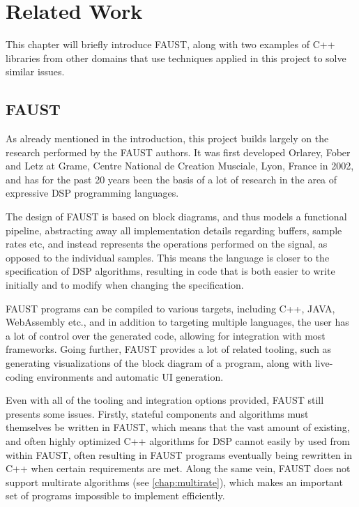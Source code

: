 \chapter{Related Work}
\label{chap:related}

This chapter will briefly introduce FAUST, along with two examples of C++ libraries from other domains that
use techniques applied in this project to solve similar issues.

\section{FAUST}
\label{sec:related_faust}
As already mentioned in the introduction, this project builds largely on the research performed by the FAUST
authors. It was first developed Orlarey, Fober and Letz at Grame, Centre National de Creation Musciale, Lyon,
France in 2002\autocite{orlarey2002}, and has for the past 20 years been the basis of a lot of research in the
area of expressive DSP programming languages\autocite{letz:hal-02158925, buffa:hal-01721483, dimitrov:hal-02158954, gaster2018, berdahl:hal-03162897}.

The design of FAUST is based on block diagrams, and thus models a functional pipeline, abstracting away all
implementation details regarding buffers, sample rates etc, and instead represents the operations performed
on the signal, as opposed to the individual samples. This means the language is closer to the specification
of DSP algorithms, resulting in code that is both easier to write initially and to modify when changing the
specification.

FAUST programs can be compiled to various targets, including C++, JAVA, WebAssembly etc., and in addition to
targeting multiple languages, the user has a lot of control over the generated code, allowing for integration
with most frameworks. Going further, FAUST provides a lot of related tooling\autocite{faustweb}, such as
generating visualizations of the block diagram of a program, along with live-coding environments and
automatic UI generation.

Even with all of the tooling and integration options provided, FAUST still presents some issues. Firstly,
stateful components and algorithms must themselves be written in FAUST, which means that the vast amount of
existing, and often highly optimized C++ algorithms for DSP\autocite{FFTW05} cannot easily by used from
within FAUST, often resulting in FAUST programs eventually being rewritten in C++ when certain requirements
are met. Along the same vein, FAUST does not support multirate algorithms (see \autoref{chap:multirate}), which
makes an important set of programs impossible to implement efficiently.

